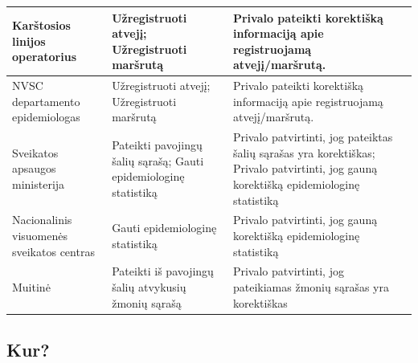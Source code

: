 \documentclass{VUMIFPSkursinis}
\begin{document}
\begin{center}
\begin{longtable}{|L{3cm}|C{5cm}|C{7cm}|}
		Karštosios linijos operatorius                                                                                          &
		Užregistruoti atvejį; Užregistruoti maršrutą                                                                            &
		Privalo pateikti korektišką informaciją apie registruojamą atvejį/maršrutą.                                                                                    \\ \hline
		NVSC departamento epidemiologas                                                                                         &
		Užregistruoti atvejį; Užregistruoti maršrutą                                                                            &
		Privalo pateikti korektišką informaciją apie registruojamą atvejį/maršrutą.                                                                                    \\ \hline
		Sveikatos apsaugos ministerija                                                                                          &
		Pateikti pavojingų šalių sąrašą; Gauti epidemiologinę statistiką                                                        &
		Privalo patvirtinti, jog pateiktas šalių sąrašas yra korektiškas; Privalo patvirtinti, jog gauną korektišką epidemiologinę statistiką                          \\ \hline
		Nacionalinis visuomenės sveikatos centras                                                                               &
		Gauti epidemiologinę statistiką                                                                                         &
		Privalo patvirtinti, jog gauną korektišką epidemiologinę statistiką                                                                                            \\ \hline
		Muitinė                                                                                                                 &
		Pateikti iš pavojingų šalių atvykusių žmonių sąrašą                                                                     &
		Privalo patvirtinti, jog pateikiamas žmonių sąrašas yra korektiškas                                                                                            \\ \hline
	\end{longtable}
\end{center}

\subsection{Kur?}
\end{document}
